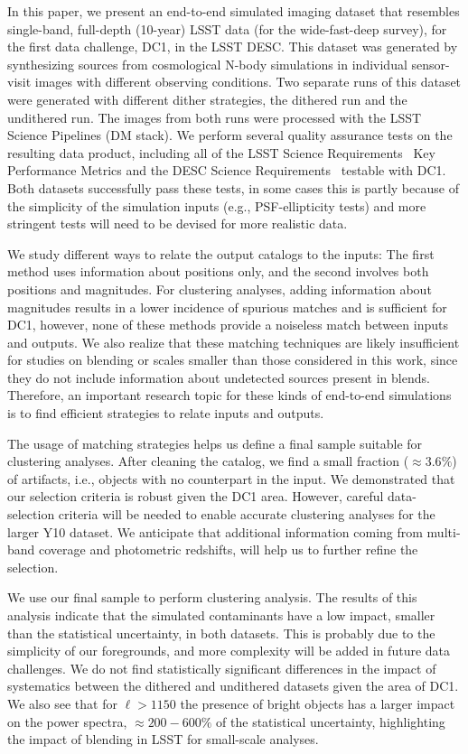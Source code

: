 \documentclass[\docopts]{\docclass}
\begin{document}
In this paper, we present an end-to-end simulated imaging dataset that resembles single-band, full-depth (10-year) LSST data (for the wide-fast-deep survey), for the first data challenge, DC1, in the LSST DESC. This dataset was generated by synthesizing sources from cosmological N-body simulations in individual sensor-visit images with different observing conditions. Two separate runs of this dataset were generated with different dither strategies, the dithered run and the undithered run. The images from both runs were processed with the LSST Science Pipelines (DM stack). We perform several quality assurance tests on the resulting data product, including all of the LSST Science Requirements~\citep{LPM-17} Key Performance Metrics and the DESC Science Requirements~\citep{2018arXiv180901669T} testable with DC1. Both datasets successfully pass these tests, in some cases this is partly because of the simplicity of the simulation inputs (e.g., PSF-ellipticity tests) and more stringent tests will need to be devised for more realistic data.

We study different ways to relate the output catalogs to the inputs: The first method uses information about positions only, and the second involves both positions and magnitudes. For clustering analyses, adding information about magnitudes results in a lower incidence of spurious matches and is sufficient for DC1, however, none of these methods provide a noiseless match between inputs and outputs. We also realize that these matching techniques are likely insufficient for studies on blending or scales smaller than those considered in this work, since they do not include information about undetected sources present in blends. Therefore, an important research topic for these kinds of end-to-end simulations is to find efficient strategies to relate inputs and outputs. 

The usage of matching strategies helps us define a final sample suitable for clustering analyses. After cleaning the catalog, we find a small fraction ($\approx 3.6\%$) of artifacts, i.e., objects with no counterpart in the input. We demonstrated that our selection criteria is robust given the DC1 area. However, careful data-selection criteria will be needed to enable accurate clustering analyses for the larger Y10 dataset. We anticipate that additional information coming from multi-band coverage and photometric redshifts, will help us to further refine the selection.

We use our final sample to perform clustering analysis. The results of this analysis indicate that the simulated contaminants have a low impact, smaller than the statistical uncertainty, in both datasets. This is probably due to the simplicity of our foregrounds, and more complexity will be added in future data challenges. We do not find statistically significant differences in the impact of systematics between the dithered and undithered datasets given the area of DC1. We also see that for $\ell > 1150$ the presence of bright objects has a larger impact on the power spectra, $\approx 200-600\%$ of the statistical uncertainty, highlighting the impact of blending in LSST for small-scale analyses.
\end{document}
